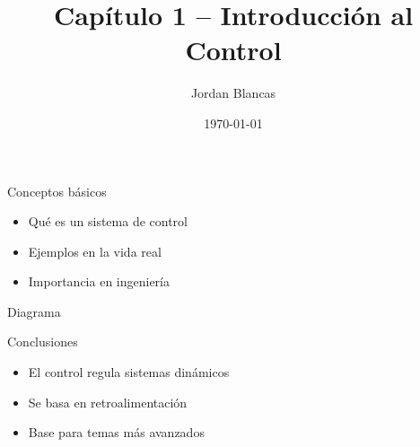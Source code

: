 \documentclass{beamer}
\title{Capítulo 1 – Introducción al Control}
\author{Jordan Blancas}
\date{\today}
\begin{document}
\begin{frame}
  \titlepage
\end{frame}

\begin{frame}{Conceptos básicos}
  \begin{itemize}
    \item Qué es un sistema de control
    \item Ejemplos en la vida real
    \item Importancia en ingeniería
  \end{itemize}
\end{frame}

\begin{frame}{Diagrama}
  \centering
\end{frame}

\begin{frame}{Conclusiones}
  \begin{itemize}
    \item El control regula sistemas dinámicos
    \item Se basa en retroalimentación
    \item Base para temas más avanzados
  \end{itemize}
\end{frame}
\end{document}
